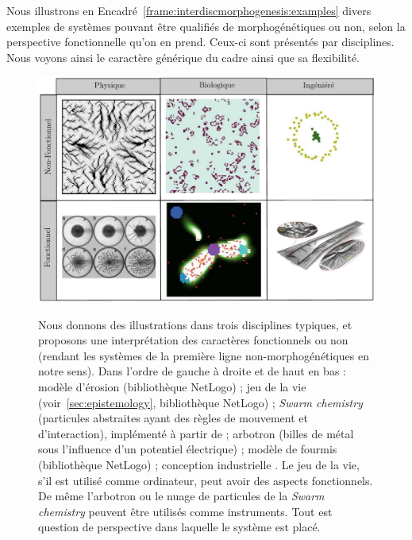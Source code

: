 Nous illustrons en Encadré~\ref{frame:interdiscmorphogenesis:examples} divers exemples de systèmes pouvant être qualifiés de morphogénétiques ou non, selon la perspective fonctionnelle qu'on en prend. Ceux-ci sont présentés par disciplines. Nous voyons ainsi le caractère générique du cadre ainsi que sa flexibilité.



\begin{figure}[h!]
	\begin{mdframed}
		
		\includegraphics[width=\linewidth]{Figures/InterdiscMorphogenesis/intro_examples_fr.pdf}
		
		\medskip
		
		Nous donnons des illustrations dans trois disciplines typiques, et proposons une interprétation des caractères fonctionnels ou non (rendant les systèmes de la première ligne non-morphogénétiques en notre sens). Dans l'ordre de gauche à droite et de haut en bas : modèle d'érosion (bibliothèque NetLogo) ; jeu de la vie (voir~\ref{sec:epistemology}, bibliothèque NetLogo) ; \emph{Swarm chemistry} (particules abstraites ayant des règles de mouvement et d'interaction), implémenté à partir de \cite{sayama2007decentralized} ; arbotron (billes de métal sous l'influence d'un potentiel électrique) \cite{jun2005formation} ; modèle de fourmis (bibliothèque NetLogo) ; conception industrielle  \cite{Aage:2017aa}. Le jeu de la vie, s'il est utilisé comme ordinateur, peut avoir des aspects fonctionnels. De même l'arbotron ou le nuage de particules de la \emph{Swarm chemistry} peuvent être utilisés comme instruments. Tout est question de perspective dans laquelle le système est placé.
		
	\end{mdframed}
\end{figure}


